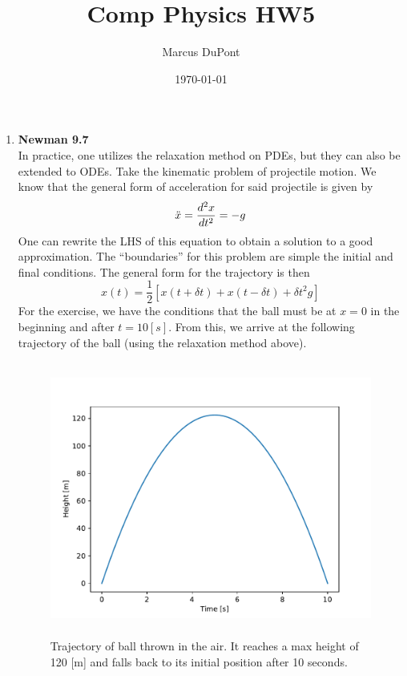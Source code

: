 \documentclass{article}
\title{Comp Physics HW5}
\author{Marcus DuPont}
\date{\today}
\begin{document}
\maketitle

\begin{enumerate}
    \item {\textbf{Newman 9.7}\\
    In practice, one utilizes the relaxation method on PDEs, but they can also be extended to ODEs. Take the kinematic problem of projectile motion. We know that the general form of acceleration for said projectile is given by
    \begin{equation*}
        \Ddot{x} = \frac{d^2 x}{dt^2} = - g
    \end{equation*}
    One can rewrite the LHS of this equation to obtain a solution to a good approximation. The ``boundaries'' for this problem are simple the initial and final conditions. The general form for the trajectory is then
    \begin{equation*}
        x(t) = \frac{1}{2}[x(t+\delta t) + x(t-\delta t) + \delta t ^2 g]
    \end{equation*}
    For the exercise, we have the conditions that the ball must be at $x = 0$ in the beginning and after $t = 10 [s]$. From this, we arrive at the following trajectory of the ball (using the relaxation method above).
    \begin{figure}[h!]
        \centering
        \includegraphics[width=\textwidth, height=9cm]{traj}
        \caption{Trajectory of ball thrown in the air. It reaches a max height of 120 [m] and falls back to its initial position after 10 seconds.}
        \label{fig:my_label}
    \end{figure}
}
\end{enumerate}
\end{document}
